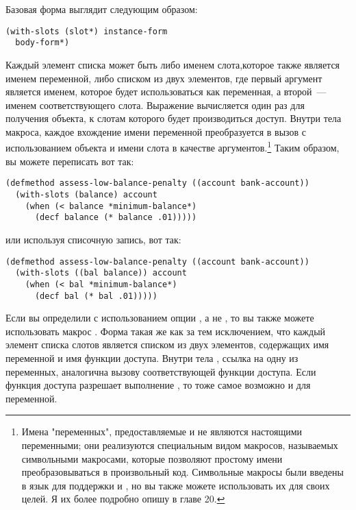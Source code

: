 Базовая форма   выглядит следующим образом:

\begin{lstlisting}
(with-slots (slot*) instance-form
  body-form*)
\end{lstlisting}

Каждый элемент списка  может быть либо именем слота,которое также является
именем переменной, либо списком из двух элементов, где первый аргумент является именем,
которое будет использоваться как переменная, а второй~--- именем соответствующего слота.
Выражение  вычисляется один раз для получения объекта, к слотам
которого будет производиться доступ.  Внутри тела макроса, каждое вхождение имени
переменной преобразуется в вызов  с использованием объекта и имени слота
в качестве аргументов.\footnote{Имена "переменных", предоставляемые  и
   не являются настоящими переменными; они реализуются специальным
  видом макросов, называемых символьными макросами, которые позволяют простому имени
  преобразовываться в произвольный код.  Символьные макросы были введены в язык для
  поддержки  и , но вы также можете использовать их
  для своих целей.  Я их более подробно опишу в главе 20.}  Таким образом, вы можете
переписать  вот так:

\begin{lstlisting}
(defmethod assess-low-balance-penalty ((account bank-account))
  (with-slots (balance) account
    (when (< balance *minimum-balance*)
      (decf balance (* balance .01)))))
\end{lstlisting}

или используя списочную запись, вот так:

\begin{lstlisting}
(defmethod assess-low-balance-penalty ((account bank-account))
  (with-slots ((bal balance)) account
    (when (< bal *minimum-balance*)
      (decf bal (* bal .01)))))
\end{lstlisting}

Если вы определили  с использованием опции , а не
, то вы также можете использовать макрос .  Форма
 такая же как  за тем исключением, что каждый
элемент списка слотов является списком из двух элементов, содержащих имя переменной и имя
функции доступа.  Внутри тела , ссылка на одну из переменных,
аналогична вызову соответствующей функции доступа.  Если функция доступа разрешает
выполнение , то тоже самое возможно и для переменной.

